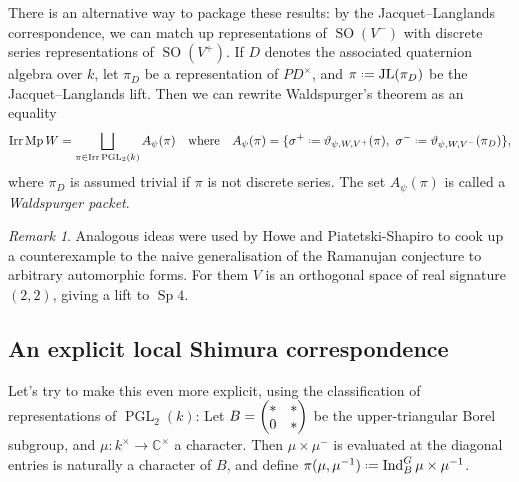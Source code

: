 \documentclass[11pt,a4paper,leqno]{article}
\newcommand{\1}{\mathbbm{1}}
\newcommand{\C}{\mathbb{C}}
\newcommand*{\defeq}{\mathrel{\vcenter{\baselineskip0.5ex \lineskiplimit0pt
      \hbox{\scriptsize.}\hbox{\scriptsize.}}}%
  =}
\renewcommand{\theta}{\vartheta}
\DeclareMathOperator{\Irr}{Irr}
\DeclareMathOperator{\Ind}{Ind}
\DeclareMathOperator{\Sp}{Sp}
\DeclareMathOperator{\Mp}{Mp}
\DeclareMathOperator{\SO}{SO}
\DeclareMathOperator{\PGL}{PGL}
\theoremstyle{plain}
\theoremstyle{definition}
\theoremstyle{remark}
\newtheorem*{remark}{Remark}
\numberwithin{equation}{section}
\begin{document}
There is an alternative way to package these results: by the
Jacquet--Langlands correspondence, we can match up
representations of $\SO(V^{-})$ with discrete series representations
of $\SO(V^{+})$. If $D$ denotes the associated quaternion algebra over
$k$, let $\pi_{D}$ be a representation of $PD^{\times}$, and $\pi \defeq
\operatorname{JL} (\pi_{D})$ be the Jacquet--Langlands lift. Then we can 
rewrite Waldspurger's theorem as an equality
\begin{equation}
  \label{eq:21}
\Irr \Mp W = \bigsqcup_{\pi \in \Irr \PGL_{2}(k)}A_{\psi}(\pi) \qq{where}
A_{\psi}(\pi) = \{\sigma^{+} \defeq \theta_{\psi,W,V^{+}}(\pi), \ \sigma^{-} \defeq \theta_{\psi,W,V^{-}}(\pi_{D})\},
\end{equation}
where $\pi_{D}$ is assumed trivial if $\pi$ is not discrete series. The
set $A_{\psi}(\pi)$ is called a \emph{Waldspurger packet}.
\begin{remark}
  Analogous ideas were used by Howe and Piatetski-Shapiro to cook up a
  counterexample to the naive generalisation of the Ramanujan
  conjecture to arbitrary automorphic forms. For them $V$ is an
  orthogonal space of real signature $(2,2)$, giving a lift to $\Sp
  4$. 
\end{remark}

\subsection{An explicit local Shimura correspondence}
\label{sec:an-explicit-local}

Let's try to make this even more explicit, using the classification of
representations of $\PGL_{2}(k)$: Let $B = \mqty(*  & * \\ 0 & *)$ be
the upper-triangular Borel subgroup, and $\mu \colon k^{\times} \to \C^{\times}$ a
character. Then $\mu \times \mu^{-}$ is evaluated at the diagonal entries is
naturally a character of $B$, and define $\pi(\mu,\mu^{-1}) \defeq
\Ind_{B}^{G}\mu \times \mu^{-1}$.
\end{document}
